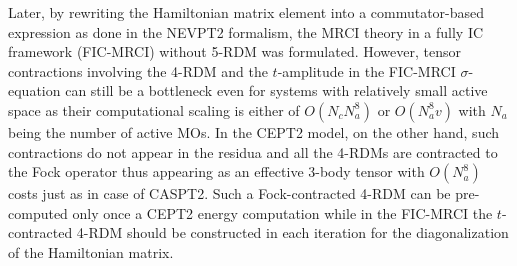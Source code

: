 \documentclass[aip,jcp,amsmath,twocolumn,floatfix,reprint,fleqn]{revtex4-1}
\begin{document}
%
Later, by rewriting the Hamiltonian matrix element into a commutator-based expression as done in the NEVPT2 formalism,\cite{angeliintroduction2001} the MRCI theory in a fully IC framework (FIC-MRCI) without 5-RDM was formulated.\cite{saitowmultireference2013,doi:10.1021/acs.jctc.5b00270,doi:10.1063/1.4907717,doi:10.1063/1.4959029}
%
However, tensor contractions involving the 4-RDM and the $t$-amplitude in the FIC-MRCI $\sigma$-equation can still be a bottleneck even for systems with relatively small active space as their computational scaling is either of $O(N_c N_a^8)$ or $O(N_a^8v)$ with $N_a$ being the number of active MOs.
%
In the CEPT2 model, on the other hand, such contractions do not appear in the residua and all the 4-RDMs are contracted to the Fock operator thus appearing as an effective 3-body tensor with $O(N_a^8)$ costs just as in case of CASPT2.
%
Such a Fock-contracted 4-RDM can be pre-computed only once a CEPT2 energy computation while in the FIC-MRCI the $t$-contracted 4-RDM should be constructed in each iteration for the diagonalization of the Hamiltonian matrix.

\end{document}
